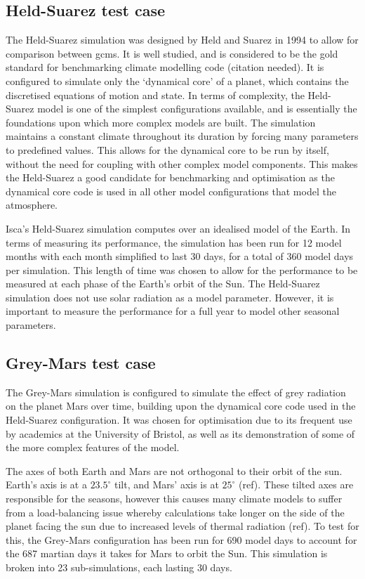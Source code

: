 \documentclass[a4paper,11pt]{report}
\begin{document}
\subsection{Held-Suarez test case}
The Held-Suarez simulation was designed by Held and Suarez in 1994 \cite{held1994proposal} to allow for comparison between \gls{gcm}s. It is well studied, and is considered to be the gold standard for benchmarking climate modelling code (citation needed). It is configured to simulate only the `dynamical core' of a planet, which contains the discretised equations of motion and state. In terms of complexity, the Held-Suarez model is one of the simplest configurations available, and is essentially the foundations upon which more complex models are built. The simulation maintains a constant climate throughout its duration by forcing many parameters to predefined values. This allows for the dynamical core to be run by itself, without the need for coupling with other complex model components. This makes the Held-Suarez a good candidate for benchmarking and optimisation as the dynamical core code is used in all other model configurations that model the atmosphere. 
\par
Isca's Held-Suarez simulation computes over an idealised model of the Earth. In terms of measuring its performance, the simulation has been run for 12 model months with each month simplified to last 30 days, for a total of 360 model days per simulation. This length of time was chosen to allow for the performance to be measured at each phase of the Earth's orbit of the Sun. The Held-Suarez simulation does not use solar radiation as a model parameter. However, it is important to measure the performance for a full year to model other seasonal parameters.

\subsection{Grey-Mars test case}
The Grey-Mars simulation is configured to simulate the effect of grey radiation on the planet Mars over time, building upon the dynamical core code used in the Held-Suarez configuration. It was chosen for optimisation due to its frequent use by academics at the University of Bristol, as well as its demonstration of some of the more complex features of the model. 
\par
The axes of both Earth and Mars are not orthogonal to their orbit of the sun. Earth's axis is at a $23.5^{\circ}$ tilt, and Mars' axis is at $25^{\circ}$ (ref).  These tilted axes are responsible for the seasons, however this causes many climate models to suffer from a load-balancing issue whereby calculations take longer on the side of the planet facing the sun due to increased levels of thermal radiation (ref). To test for this, the Grey-Mars configuration has been run for 690 model days to account for the 687 martian days it takes for Mars to orbit the Sun. This simulation is broken into 23 sub-simulations, each lasting 30 days. 
\end{document}
